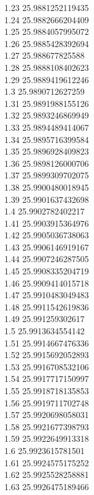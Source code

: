 {1.23	25.9881252119435\\
1.24	25.9882666204409\\
1.25	25.9884057995072\\
1.26	25.9885428392694\\
1.27	25.988677825588\\
1.28	25.9888108402623\\
1.29	25.9889419612246\\
1.3	25.9890712627259\\
1.31	25.9891988155126\\
1.32	25.9893246869949\\
1.33	25.9894489414067\\
1.34	25.9895716399584\\
1.35	25.9896928409823\\
1.36	25.9898126000706\\
1.37	25.9899309702075\\
1.38	25.9900480018945\\
1.39	25.9901637432698\\
1.4	25.9902782402217\\
1.41	25.9903915364976\\
1.42	25.9905036738063\\
1.43	25.9906146919167\\
1.44	25.9907246287505\\
1.45	25.9908335204719\\
1.46	25.9909414015718\\
1.47	25.9910483049483\\
1.48	25.9911542619836\\
1.49	25.991259302617\\
1.5	25.9913634554142\\
1.51	25.9914667476336\\
1.52	25.9915692052893\\
1.53	25.9916708532106\\
1.54	25.9917717150997\\
1.55	25.9918718135853\\
1.56	25.9919711702748\\
1.57	25.9920698058031\\
1.58	25.9921677398793\\
1.59	25.9922649913318\\
1.6	25.9923615781501\\
1.61	25.9924575175252\\
1.62	25.9925528258881\\
1.63	25.9926475189466\\
}
